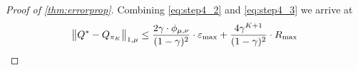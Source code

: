 \begin{proof}[Proof of \cref{thm:errorprop}]
  Combining \cref{eq:step4_2} and \cref{eq:step4_3} we arrive at
  \begin{equation}
    \norm{Q^* - Q_{\pi_K}}_{1,\mu} \leq
    \frac{2\gamma \cdot \phi_{\mu,\nu}}{(1-\gamma)^2} \cdot \varepsilon_{\max}
    + \frac{4\gamma^{K+1}}{(1-\gamma)^2} \cdot R_{\max}
  \end{equation}
\end{proof}



